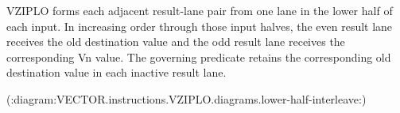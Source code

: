 VZIPLO forms each adjacent result-lane pair from one lane in the lower half of
each input.  In increasing order through those input halves, the even result
lane receives the old destination value and the odd result lane receives the
corresponding Vn value.  The governing predicate retains the corresponding old
destination value in each inactive result lane.

(:diagram:VECTOR.instructions.VZIPLO.diagrams.lower-half-interleave:)
